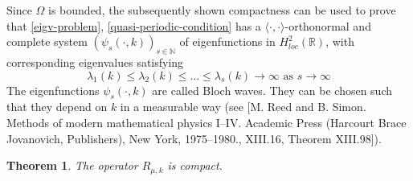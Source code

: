 \documentclass[fontsize=14pt,a4paper,DIV=1]{scrartcl}
\newtheorem{theorem}{Theorem}[section]
\numberwithin{equation}{section}
\newcommand{\R}{\mathbb{R}}
\newcommand{\N}{\mathbb{N}}
\begin{document}
	Since $\Omega$ is bounded, the subsequently shown compactness can be used to prove that \eqref{eigv-problem}, \eqref{quasi-periodic-condition} has a $\langle \cdot , \cdot \rangle$-orthonormal and complete system $(\psi_{s}(\cdot, k))_{s \in \N}$ of eigenfunctions in $H^{2}_{loc}(\R)$, with corresponding eigenvalues satisfying	
	\[ \lambda_{1}(k) \leq \lambda_{2}(k) \leq \dotsc \leq \lambda_{s}(k) \rightarrow \infty \text{ as } s \rightarrow \infty \]
	The eigenfunctions $\psi_{s}(\cdot, k)$ are called Bloch waves. They can be chosen such that they depend on $k$ in a measurable way (see [M. Reed and B. Simon. Methods of modern mathematical physics I–IV. Academic Press (Harcourt Brace Jovanovich, Publishers), New York, 1975–1980., XIII.16, Theorem XIII.98]).  \\ %
	\begin{theorem}
		The operator $R_{\mu, k}$ is compact.
	\end{theorem}
\end{document}
